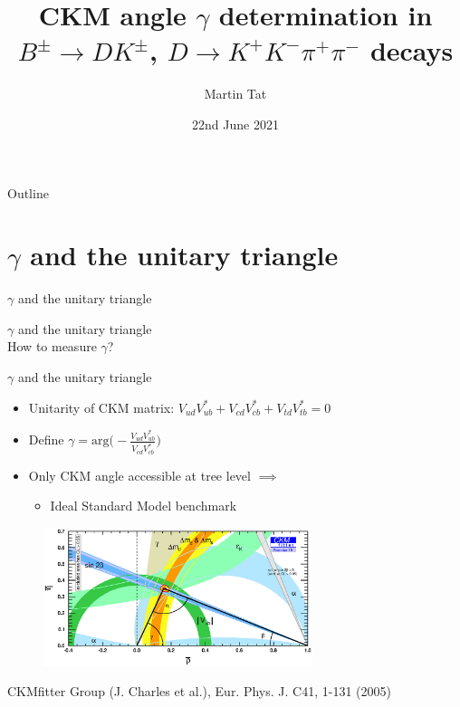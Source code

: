 \documentclass{beamer}
\title[$B^\pm\to(K^+K^-\pi^+\pi^-)_DK^\pm$]{CKM angle \texorpdfstring{$\gamma$}{gamma} determination in \texorpdfstring{$B^\pm\to DK^\pm$, $D\to K^+K^-\pi^+\pi^-$}{B to DK, D to K+K-pi+pi-} decays}
\author{Martin Tat}
\institute{Oxford LHCb}
\date{22nd June 2021}
\begin{document}
\begin{frame}
  \titlepage
\end{frame}

\begin{frame}{Outline}
  \tableofcontents
\end{frame}

\section{\texorpdfstring{$\gamma$}{gamma} and the unitary triangle}
\begin{frame}{$\gamma$ and the unitary triangle}
  \begin{center}
    {\huge $\gamma$ and the unitary triangle} \\
    \vspace{1cm}
    {\Large How to measure $\gamma$?}
  \end{center}
\end{frame}

\begin{frame}{$\gamma$ and the unitary triangle}
  \begin{itemize}
    \setlength\itemsep{1.3em}
    \item{Unitarity of CKM matrix: $V_{ud}V^*_{ub} + V_{cd}V^*_{cb} + V_{td}V^*_{tb} = 0$}
    \item{Define $\gamma = \text{arg}\Big(-\frac{V_{ud}V^*_{ub}}{V_{cd}V^*_{cb}}\Big)$}
    \item{Only CKM angle accessible at tree level $\implies$}
    \begin{itemize}
      \item{Ideal Standard Model benchmark}
    \end{itemize}
  \end{itemize}
  \begin{figure}
    \includegraphics[width = 0.70\textwidth]{ckmfitter2.eps}
  \end{figure}
  \vspace{-0.7cm}
  \begin{center}
    CKMfitter Group (J. Charles et al.), Eur. Phys. J. C41, 1-131 (2005)
  \end{center}
\end{frame}
\end{document}
